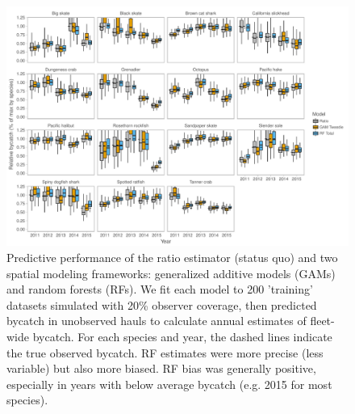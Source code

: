 \documentclass[]{article}
\begin{document}
\begin{landscape}
\begin{figure}

{\centering \includegraphics[width=10in]{bycatch_sim_paper_sepsupp_files/figure-latex/model-comparison-byyear-catch-1} 

}

\caption{Predictive performance of the ratio estimator (status quo) and two spatial modeling frameworks: generalized additive models (GAMs) and random forests (RFs). We fit each model to 200 'training' datasets simulated with 20\% observer coverage, then predicted bycatch in unobserved hauls to calculate annual estimates of fleet-wide bycatch. For each species and year, the dashed lines indicate the true observed bycatch. RF estimates were more precise (less variable) but also more biased. RF bias was generally positive, especially in years with below average bycatch (e.g. 2015 for most species).}\label{fig:model-comparison-byyear-catch}
\end{figure}
\end{landscape}

\pagebreak
\end{document}
